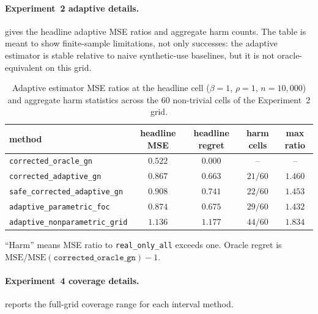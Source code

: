 \paragraph{Experiment~2 adaptive details.}  gives the headline adaptive MSE ratios and aggregate harm counts. The table is meant to show finite-sample limitations, not only successes: the adaptive estimator is stable relative to naive synthetic-use baselines, but it is not oracle-equivalent on this grid.

\begin{table}[!t]
  \centering
  \caption{Adaptive estimator MSE ratios at the headline cell ($\beta=1$,
  $\rho=1$, $n=10{,}000$) and aggregate harm statistics across the $60$
  non-trivial cells of the Experiment~2 grid.}
  \label{tab:adaptive}
  \begin{threeparttable}
  \small
  \setlength{\tabcolsep}{3pt}
  \begin{tabular}{lcccc}
    \toprule
    method & headline MSE & headline regret & harm cells & max ratio \\
    \midrule
    \texttt{corrected\_oracle\_gn}             & $0.522$ & $0.000$ & --        & --        \\
    \texttt{corrected\_adaptive\_gn}           & $0.867$ & $0.663$ & $21/60$   & $1.460$   \\
    \texttt{safe\_corrected\_adaptive\_gn}     & $0.908$ & $0.741$ & $22/60$   & $1.453$   \\
    \texttt{adaptive\_parametric\_foc}         & $0.874$ & $0.675$ & $29/60$   & $1.432$   \\
    \texttt{adaptive\_nonparametric\_grid}     & $1.136$ & $1.177$ & $44/60$   & $1.834$   \\
    \bottomrule
  \end{tabular}
  \begin{tablenotes}
    \small
    \item[a] ``Harm'' means MSE ratio to \texttt{real\_only\_all} exceeds one.
    Oracle regret is
    $\mathrm{MSE}/\mathrm{MSE}(\texttt{corrected\_oracle\_gn}) - 1$.
  \end{tablenotes}
  \end{threeparttable}
\end{table}

\paragraph{Experiment~4 coverage details.}  reports the full-grid coverage range for each interval method.

